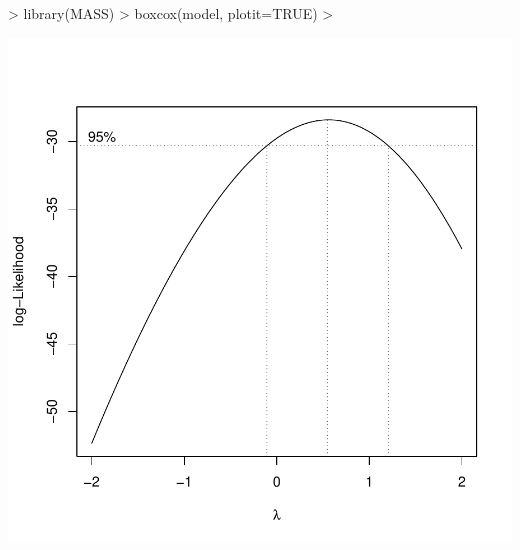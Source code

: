 \documentclass{article}
\begin{document}
\begin{Schunk}
\begin{Sinput}
> library(MASS)
> boxcox(model, plotit=TRUE)
> 
\end{Sinput}
\end{Schunk}
\includegraphics{Assignment3a-009}
\end{document}
